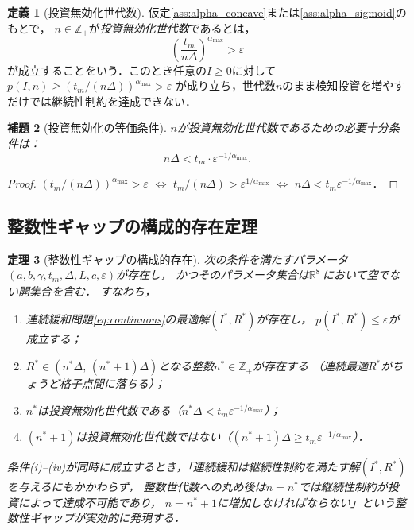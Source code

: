 \documentclass[12pt,a4paper]{article}
\theoremstyle{plain}
\newtheorem{theorem}{定理}[section]
\newtheorem{lemma}[theorem]{補題}
\theoremstyle{definition}
\newtheorem{definition}[theorem]{定義}
\theoremstyle{remark}
\newcommand{\R}{\mathbb{R}}
\newcommand{\Z}{\mathbb{Z}}
\begin{document}
\begin{definition}[投資無効化世代数]\label{def:inv_inval}
仮定\ref{ass:alpha_concave}または\ref{ass:alpha_sigmoid}のもとで，
$n \in \Z_+$が\emph{投資無効化世代数}であるとは，
\[
  \left(\frac{t_m}{n\Delta}\right)^{\alpha_{\max}} > \varepsilon
\]
が成立することをいう．このとき任意の$I \ge 0$に対して$p(I,n) \ge (t_m/(n\Delta))^{\alpha_{\max}} > \varepsilon$
が成り立ち，世代数$n$のまま検知投資を増やすだけでは継続性制約を達成できない．
\end{definition}

\begin{lemma}[投資無効化の等価条件]\label{lem:inval_cond}
$n$が投資無効化世代数であるための必要十分条件は：
\begin{equation}\label{eq:inval_cond}
  n\Delta < t_m \cdot \varepsilon^{-1/\alpha_{\max}}.
\end{equation}
\end{lemma}

\begin{proof}
$(t_m/(n\Delta))^{\alpha_{\max}} > \varepsilon$
$\Leftrightarrow$
$t_m/(n\Delta) > \varepsilon^{1/\alpha_{\max}}$
$\Leftrightarrow$
$n\Delta < t_m\varepsilon^{-1/\alpha_{\max}}$．
\end{proof}

\subsection{整数性ギャップの構成的存在定理}

\begin{theorem}[整数性ギャップの構成的存在]\label{thm:gap}
次の条件を満たすパラメータ$(a,b,\gamma,t_m,\Delta,L,c,\varepsilon)$が存在し，
かつそのパラメータ集合は$\R_+^8$において空でない開集合を含む．
すなわち，
\begin{enumerate}[label=(\roman*)]
  \item 連続緩和問題\eqref{eq:continuous}の最適解$(I^*, R^*)$が存在し，
        $p(I^*, R^*) \le \varepsilon$が成立する；
  \item $R^* \in (n^*\Delta,\, (n^*+1)\Delta)$となる整数$n^* \in \Z_+$が存在する
        （連続最適$R^*$がちょうど格子点間に落ちる）；
  \item $n^*$は投資無効化世代数である（$n^*\Delta < t_m\varepsilon^{-1/\alpha_{\max}}$）；
  \item $(n^*+1)$は投資無効化世代数ではない（$(n^*+1)\Delta \ge t_m\varepsilon^{-1/\alpha_{\max}}$）．
\end{enumerate}
条件(i)--(iv)が同時に成立するとき，「連続緩和は継続性制約を満たす解$(I^*,R^*)$を与えるにもかかわらず，
整数世代数への丸め後は$n=n^*$では継続性制約が投資によって達成不可能であり，
$n=n^*+1$に増加しなければならない」という整数性ギャップが実効的に発現する．
\end{theorem}
\end{document}
